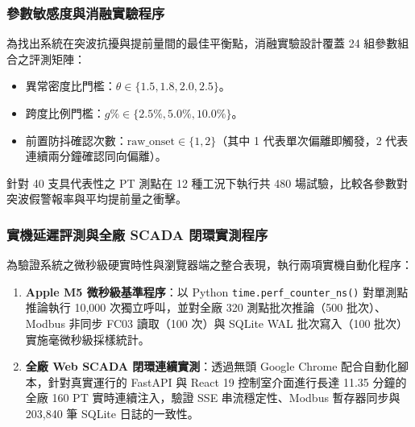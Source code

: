 \documentclass[fontset=none, a4paper, 12pt]{ctexart}
\begin{document}
\begin{doublespace}
\subsubsection{參數敏感度與消融實驗程序}
為找出系統在突波抗擾與提前量間的最佳平衡點，消融實驗設計覆蓋 24 組參數組合之評測矩陣：
\begin{itemize}
    \item 異常密度比門檻：$\theta \in \{1.5, 1.8, 2.0, 2.5\}$。
    \item 跨度比例門檻：$g\% \in \{2.5\%, 5.0\%, 10.0\%\}$。
    \item 前置防抖確認次數：$\text{raw\_onset} \in \{1, 2\}$（其中 1 代表單次偏離即觸發，2 代表連續兩分鐘確認同向偏離）。
\end{itemize}
針對 40 支具代表性之 PT 測點在 12 種工況下執行共 480 場試驗，比較各參數對突波假警報率與平均提前量之衝擊。

\subsubsection{實機延遲評測與全廠 SCADA 閉環實測程序}
為驗證系統之微秒級硬實時性與瀏覽器端之整合表現，執行兩項實機自動化程序：
\begin{enumerate}
    \item \textbf{Apple M5 微秒級基準程序}：以 Python \texttt{time.perf\_counter\_ns()} 對單測點推論執行 10,000 次獨立呼叫，並對全廠 320 測點批次推論（500 批次）、Modbus 非同步 FC03 讀取（100 次）與 SQLite WAL 批次寫入（100 批次）實施毫微秒級採樣統計。
    \item \textbf{全廠 Web SCADA 閉環連續實測}：透過無頭 Google Chrome 配合自動化腳本，針對真實運行的 FastAPI 與 React 19 控制室介面進行長達 11.35 分鐘的全廠 160 PT 實時連續注入，驗證 SSE 串流穩定性、Modbus 暫存器同步與 203,840 筆 SQLite 日誌的一致性。
\end{enumerate}


\end{doublespace}
\end{document}
